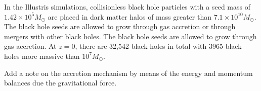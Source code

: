 In the Illustris simulations, collisionless black hole particles with
a seed mass of $1.42\times10^{5}M_{\odot}$ are placed in dark matter
halos of mass greater than $7.1\times10^{10}M_{\odot}$\citep{sijacki2014theillustris}.
The black hole seeds are allowed to grow through gas accretion or
through mergers with other black holes. The black hole seeds are allowed
to grow through gas accretion. At $z=0$, there are 32,542 black holes
in total with 3965 black holes more massive than $10^{7}M_{\odot}$.
\begin{lyxgreyedout}
Add a note on the accretion mechanism by means of the energy and momentum
balances due the gravitational force.%
\end{lyxgreyedout}
\begin{comment}
In the Illustris simulations, collisionless black hole particles with
a seed mass of $1.42\times10^{5}M_{\odot}$ are placed in dark matter
halos of mass greater than $7.1\times10^{10}M_{\odot}$\citep{sijacki2014theillustris}.
The black hole seeds are allowed to grow through gas accretion or
through mergers with other black holes. The black hole seeds are allowed
to grow through gas accretion, parametrized in terms of Eddington
limited Bondi-Hoyle-Lyttleton (BHL)-like accretion (\citet{bondi1952accretion,bondihoyle1044}),
or through mergers with other black holes. BHL is a non-spherical
accretion flow which develops when a compact object moves relative
to a uniform gas cloud. The BHL accretion rate on the black hole is
given by

\begin{equation}
\dot{M}_{B}=\frac{4\pi G^{2}M_{BH}^{2}\rho}{(c_{s}^{2}+v^{2})^{3/2}},
\end{equation}


where $\rho$ and $c_{s}$ are the density and sound speed of the
gas, respectively, $\alpha$ is a dimensionless parameter, and $v$
is the velocity of the black hole relative to the gas. Then, the accretion
is limited to the Eddinton rate,

\begin{equation}
\dot{M}_{Edd}=\frac{4\pi G^{2}M_{BH}m_{p}}{\epsilon_{r}\sigma_{T}c},
\end{equation}


where $m_{p}$ is the proton mass, $\sigma_{T}$is the Thompson cross-section
and $\epsilon_{r}$is the radiative efficiency. The radiaitve efficiency
is related to the radiated bolometric luminosity, $L_{B}$, and accretion
rate, $\dot{M}_{BH}$, by
\begin{lyxcode}
\begin{equation}
\epsilon_{r}=\frac{L_{r}}{\dot{M}_{BH}}
\end{equation}

\end{lyxcode}
This simply gives the mass to energy conversion efficiency set by
the amount of energy that can be extracted from the innermost stable
orbit of an accretion disk around a black hole.
\end{comment}
